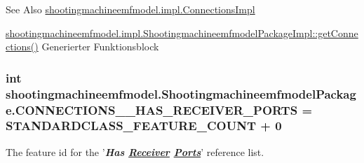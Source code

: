 \begin{DoxySeeAlso}{See Also}
\hyperlink{classshootingmachineemfmodel_1_1impl_1_1_connections_impl}{shootingmachineemfmodel.\-impl.\-Connections\-Impl} 

\hyperlink{classshootingmachineemfmodel_1_1impl_1_1_shootingmachineemfmodel_package_impl_a60e10b61ac1758c8993ad4ef5b5a192a}{shootingmachineemfmodel.\-impl.\-Shootingmachineemfmodel\-Package\-Impl\-::get\-Connections()} Generierter Funktionsblock 
\end{DoxySeeAlso}
\hypertarget{interfaceshootingmachineemfmodel_1_1_shootingmachineemfmodel_package_a3760c55c51ab5f6ecc162f371ad4f14a}{
\subsubsection[{C\-O\-N\-N\-E\-C\-T\-I\-O\-N\-S\-\_\-\-\_\-\-H\-A\-S\-\_\-\-R\-E\-C\-E\-I\-V\-E\-R\-\_\-\-P\-O\-R\-T\-S}]{\setlength{\rightskip}{0pt plus 5cm}int shootingmachineemfmodel.\-Shootingmachineemfmodel\-Package.\-C\-O\-N\-N\-E\-C\-T\-I\-O\-N\-S\-\_\-\-\_\-\-H\-A\-S\-\_\-\-R\-E\-C\-E\-I\-V\-E\-R\-\_\-\-P\-O\-R\-T\-S = {\bf S\-T\-A\-N\-D\-A\-R\-D\-C\-L\-A\-S\-S\-\_\-\-F\-E\-A\-T\-U\-R\-E\-\_\-\-C\-O\-U\-N\-T} + 0}}\label{interfaceshootingmachineemfmodel_1_1_shootingmachineemfmodel_package_a3760c55c51ab5f6ecc162f371ad4f14a}
The feature id for the '{\itshape {\bfseries Has \hyperlink{interfaceshootingmachineemfmodel_1_1_receiver}{Receiver} \hyperlink{interfaceshootingmachineemfmodel_1_1_ports}{Ports}}}' reference list.

